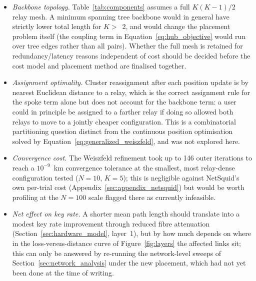 \documentclass[12pt]{article}
\begin{document}
\begin{itemize}
    \item \textit{Backbone topology.} Table~\ref{tab:components} assumes a full $K(K-1)/2$ relay mesh. A minimum spanning tree backbone would in general have strictly lower total length for $K>$~2, and would change the placement problem itself (the coupling term in Equation~\ref{eq:hub_objective} would run over tree edges rather than all pairs). Whether the full mesh is retained for redundancy/latency reasons independent of cost should be decided before the cost model and placement method are finalised together.
    \item \textit{Assignment optimality.} Cluster reassignment after each position update is by nearest Euclidean distance to a relay, which is the correct assignment rule for the spoke term alone but does not account for the backbone term: a user could in principle be assigned to a farther relay if doing so allowed both relays to move to a jointly cheaper configuration. This is a combinatorial partitioning question distinct from the continuous position optimisation solved by Equation~\ref{eq:generalized_weiszfeld}, and was not explored here.
    \item \textit{Convergence cost.} The Weiszfeld refinement took up to 146 outer iterations to reach a $10^{-9}$~km convergence tolerance at the smallest, most relay-dense configuration tested ($N=10$, $K=5$); this is negligible against NetSquid's own per-trial cost (Appendix~\ref{sec:appendix_netsquid}) but would be worth profiling at the $N=100$ scale flagged there as currently infeasible.
    \item \textit{Net effect on key rate.} A shorter mean path length should translate into a modest key rate improvement through reduced fibre attenuation (Section~\ref{sec:hardware_model}, layer~1), but by how much depends on where in the loss-versus-distance curve of Figure~\ref{fig:layers} the affected links sit; this can only be answered by re-running the network-level sweeps of Section~\ref{sec:network_analysis} under the new placement, which had not yet been done at the time of writing.

\end{itemize}
\end{document}

